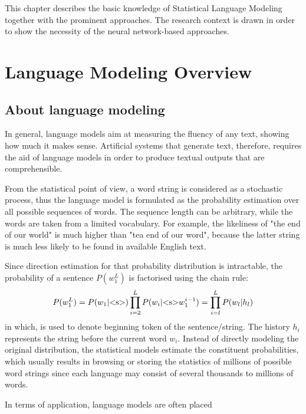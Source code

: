 This chapter describes the basic knowledge of Statistical Language Modeling together with the prominent approaches. The research context is 
drawn in order to show the necessity of the neural network-based approaches. 

\section{Language Modeling Overview}

\subsection{About language modeling}
In general, language models aim at measuring the fluency of any text, showing how much it makes sense. Artificial systems that generate text, therefore, requires
the aid of language models in order to produce textual outputs that are comprehensible. 

From the statistical point of view, a word string is considered as a stochastic process, thus the language model is formulated as the probability estimation over all 
possible sequences of words. The sequence length can be arbitrary, while the words are taken from a limited vocabulary. For example, the likeliness of "the end of our world" is much higher than "tea end of our word", because the latter string is much less likely to be found in available English text. 

Since direction estimation for that probability distribution is intractable, the probability of a sentence $P(w_1^L)$ is factorised using the chain rule:
\begin{equation}
\label{eq:lm1}
P(w_1^L) = P(w_1 | \text{\textless s\textgreater}) \prod_{i=2}^L P(w_i | \text{\textless s\textgreater} w_1^{i-1})\\
		 = \prod_{i=l}^L P(w_l | h_l)
\end{equation}
in which,  is used to denote beginning token of the sentence/string. The history $h_i$ represents the string before the current word $w_i$. Instead of directly modeling the original distribution, the statistical models estimate the constituent probabilities, which usually results in browsing or storing the statistics of millions of
possible word strings since each language may consist of several thousands to millions of words. 

In terms of application, language models are often placed 


